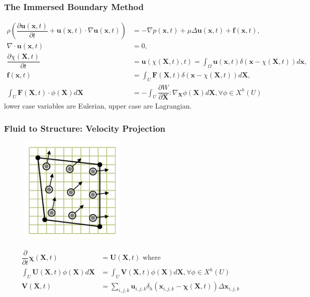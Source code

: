 \documentclass[8pt]{beamer}
\begin{document}
\begin{frame}
    \frametitle{The Immersed Boundary Method}
    \begin{align*}
        \rho
        \left(
        \dfrac{\partial\mathbf{u}(\mathbf{x}, t)}{\partial t}
        + \mathbf{u}(\mathbf{x}, t) \cdot \nabla \mathbf{u}(\mathbf{x}, t)
        \right)
        &= -\nabla p(\mathbf{x}, t)
        + \mu \Delta \mathbf{u} (\mathbf{x}, t)
        + \mathbf{f}(\mathbf{x}, t),                                          \\
        \nabla \cdot \mathbf{u}(\mathbf{x}, t) &= 0,                          \\
        \dfrac{\partial \chi(\mathbf{X}, t)}{\partial t} &=
        \mathbf{u}(\chi(\mathbf{X}, t), t)
        = \int_\Omega \mathbf{u}(\mathbf{x}, t)
        \delta (\mathbf{x} - \chi(\mathbf{X}, t)) d\mathbf{x},                \\
        \mathbf{f}(\mathbf{x}, t) &=
        \int_{U} \mathbf{F}(\mathbf{X}, t)
        \delta(\mathbf{x} - \chi(\mathbf{X}, t)) d\mathbf{X},                 \\
        \int_U \mathbf{F}(\mathbf{X}, t) \cdot \phi(\mathbf{X}) d\mathbf{X}
        &= -\int_U\dfrac{\partial W}{\partial \mathbf{X}} : \nabla_{\mathbf{X}}
        \phi(\mathbf{X}) d\mathbf{X}, \forall \phi \in X^h(U)
    \end{align*}
    lower case variables are Eulerian, upper case are Lagrangian.
\end{frame}

\begin{frame}
    \frametitle{Fluid to Structure: Velocity Projection}
    \begin{figure}
        \includegraphics[width=2in]{gquad2d_4a-632.pdf}
    \end{figure}
    \begin{align*}
        \dfrac{\partial}{\partial t} \mathbf{\chi}(\mathbf{X}, t)
        &= \mathbf{U}(\mathbf{X}, t) \text{ where}                            \\
        \int_U \mathbf{U}(\mathbf{X}, t) \phi(\mathbf{X}) d\mathbf{X} &=
        \int_U \mathbf{V}(\mathbf{X}, t) \phi(\mathbf{X}) d\mathbf{X}, \forall
        \phi \in X^h(U)                                                       \\
        \mathbf{V}(\mathbf{X}, t) &= \sum_{i,j,k} \mathbf{u}_{i,j,k}
        \delta_h(\mathbf{x}_{i,j,k} - \mathbf{\chi}(\mathbf{X}, t))
        \Delta \mathbf{x}_{i,j,k}
    \end{align*}
\end{frame}
\end{document}
